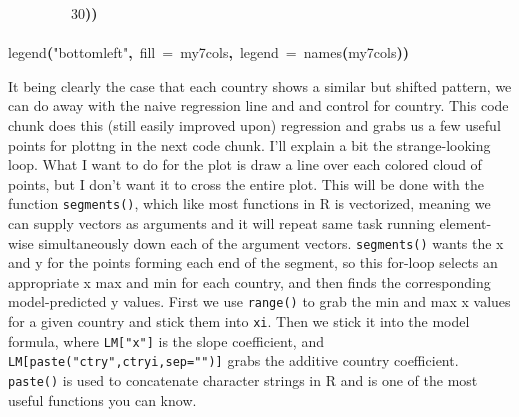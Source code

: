 \documentclass[a4paper]{article}
\newcommand{\hlnumber}[1]{\textcolor[rgb]{0.0823529411764706,0.0784313725490196,0.709803921568627}{#1}}%
\newcommand{\hlfunctioncall}[1]{\textcolor[rgb]{1,0,0}{#1}}%
\newcommand{\hlstring}[1]{\textcolor[rgb]{0.6,0.6,1}{#1}}%
\newcommand{\hlkeyword}[1]{\textcolor[rgb]{0,0,0}{\textbf{#1}}}%
\newcommand{\hlargument}[1]{\textcolor[rgb]{0.694117647058824,0.247058823529412,0.0196078431372549}{#1}}%
\newcommand{\hlsymbol}[1]{\textcolor[rgb]{0,0,0}{#1}}%
\newcommand{\hlprompt}[1]{\textcolor[rgb]{0,0,0}{#1}}%
\newcommand{\hlstd}[1]{\textcolor[rgb]{0,0,0}{#1}}%
\newenvironment{Houtput}{\raggedright}{%
%
}
\begin{document}
\begin{Houtput}
\hlstd{}\hlprompt{{\ }}{\ }{\ }{\ }{\ }{\ }{\ }{\ }{\ }\hlnumber{30}\hlkeyword{)}\hlkeyword{)}\hspace*{\fill}\\
\hlstd{}\hlprompt{{\ }}\hlkeyword{\usebox{\hlnormalsizeboxclosebrace}}\mbox{}
\normalfont
\hspace*{\fill}\\
\hlstd{}\ttfamily\noindent
\hlprompt{\usebox{\hlnormalsizeboxgreaterthan}{\ }}\hlfunctioncall{legend}\hlkeyword{(}\hlstring{"bottomleft"}\hlkeyword{,}{\ }\hlargument{fill}{\ }\hlargument{=}{\ }\hlsymbol{my7cols}\hlkeyword{,}{\ }\hlargument{legend}{\ }\hlargument{=}{\ }\hlfunctioncall{names}\hlkeyword{(}\hlsymbol{my7cols}\hlkeyword{)}\hlkeyword{)}\mbox{}
\normalfont
\hspace*{\fill}\\
\hlstd{}
\end{Houtput}
{\tikzexternaldisable

}

It being clearly the case that each country shows a similar but shifted pattern, we can do away with the naive regression line and and control for country. This code chunk does this (still easily improved upon) regression and grabs us a few useful points for plottng in the next code chunk. I'll explain a bit the strange-looking loop. What I want to do for the plot is draw a line over each colored cloud of points, but I don't want it to cross the entire plot. This will be done with the function \texttt{segments()}, which like most functions in R is vectorized, meaning we can supply vectors as arguments and it will repeat same task running element-wise simultaneously down each of the argument vectors. \texttt{segments()} wants the x and y for the points forming each end of the segment, so this for-loop selects an appropriate x max and min for each country, and then finds the corresponding model-predicted y values. First we use \texttt{range()} to grab the min and max x values for a given country and stick them into \texttt{xi}. Then we stick it into the model formula, where \texttt{LM["x"]} is the slope coefficient, and \texttt{LM[paste("ctry",ctryi,sep="")]} grabs the additive country coefficient. \texttt{paste()} is used to concatenate character strings in R and is one of the most useful functions you can know.
\end{document}
